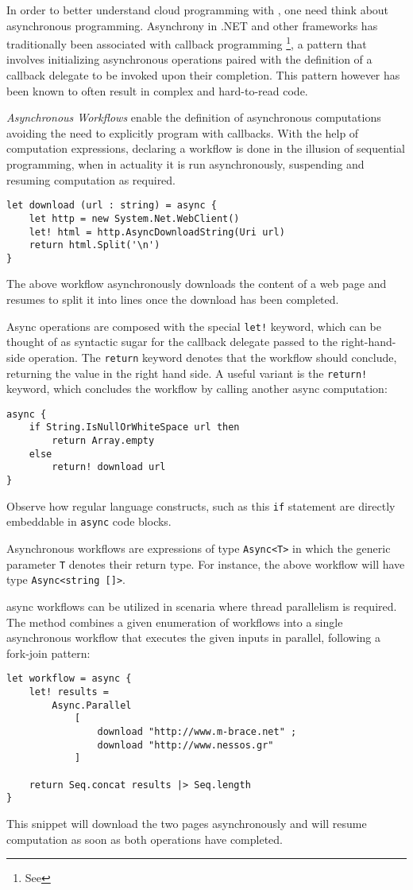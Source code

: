 In order to better understand cloud programming with \mbrace{}, 
one need think about asynchronous programming. 
Asynchrony in .NET and other frameworks has traditionally been 
associated with callback programming%
\footnote{See }, 
a pattern that involves initializing asynchronous operations paired with the definition 
of a callback delegate to be invoked upon their completion.
This pattern however has been known to often result in complex and hard-to-read code.

\fsharp{} \emph{Asynchronous Workflows} enable the definition of asynchronous 
computations avoiding the need to explicitly program with callbacks\cite{fsharp-async}. 
With the help of \fsharp{} computation expressions, 
declaring a workflow is done in the illusion of sequential programming, 
when in actuality it is run asynchronously, 
suspending and resuming computation as required.
\begin{lstlisting}
let download (url : string) = async {
    let http = new System.Net.WebClient()
    let! html = http.AsyncDownloadString(Uri url)
    return html.Split('\n')
}
\end{lstlisting}
The above workflow asynchronously downloads the content of a web page 
and resumes to split it into lines once the download has been completed.

Async operations are composed with the special \texttt{let!} keyword, 
which can be thought of as syntactic sugar for the callback delegate passed
to the right-hand-side operation.
The \texttt{return} keyword denotes that the workflow should conclude, returning 
the value in the right hand side. A useful variant is the \texttt{return!} keyword, 
which concludes the workflow by calling another async computation:
\begin{lstlisting}
async {
    if String.IsNullOrWhiteSpace url then
        return Array.empty
    else
        return! download url
}
\end{lstlisting}
Observe how regular \fsharp{} language constructs, such as this \texttt{if} statement
are directly embeddable in \texttt{async} code blocks.

Asynchronous workflows are expressions of type \texttt{Async<\uq{}T>}
in which the generic parameter \texttt{\uq{}T} denotes their return type.
For instance, the above workflow will have type \texttt{Async<string []>}.

\fsharp{} async workflows can be utilized in scenaria where thread parallelism is required. 
The method
combines a given enumeration of workflows into a single asynchronous workflow 
that executes the given inputs in parallel, following a fork-join pattern:
\begin{lstlisting}
let workflow = async {
    let! results = 
        Async.Parallel 
			[ 
				download "http://www.m-brace.net" ;
				download "http://www.nessos.gr" 
			]
 
    return Seq.concat results |> Seq.length
}
\end{lstlisting}
This snippet will download the two pages asynchronously and will resume computation 
as soon as both operations have completed.

